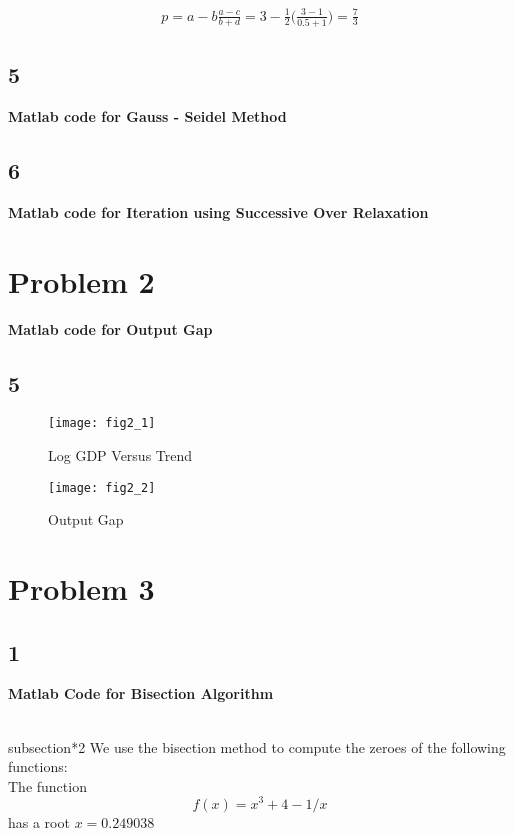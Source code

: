 \documentclass{article}
\begin{document}
\begin{equation}
\nonumber
\begin{aligned}
p = a - b \frac{a - c}{b + d} = 3 - \frac{1}{2}\bigg(\frac{3 - 1}{0.5 + 1}\bigg) = \frac{7}{3}
\end{aligned}
\end{equation}

\subsection*{5}

\textbf{Matlab code for Gauss - Seidel Method}

\subsection*{6}

\textbf{Matlab code for Iteration using Successive Over Relaxation}


\section*{Problem 2}
\textbf{Matlab code for Output Gap}


\subsection*{5}
\begin{figure}[c]
\texttt{[image: fig2\_1]}
\caption{Log GDP Versus Trend}
\end{figure}
\begin{figure}[c]
\texttt{[image: fig2\_2]}
\caption{Output Gap}
\end{figure}

\pagebreak


\pagebreak

\section*{Problem 3}
\subsection*{1}
\textbf{Matlab Code for Bisection Algorithm}

\\subsection*{2}
We use the bisection method to compute the zeroes of the following functions: \\
The function $$f(x) = x^3 + 4 - 1/x$$ has a root $x = 0.249038$\\
\end{document}
